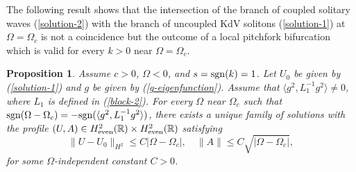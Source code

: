 \documentclass[12pt,reqno]{amsart}
\numberwithin{equation}{section}
\newtheorem{proposition}{Proposition}
\begin{document}
The following result shows that the intersection of the branch of coupled solitary waves (\ref{solution-2}) with the branch of uncoupled KdV solitons (\ref{solution-1}) at $\Omega = \Omega_c$ is not a coincidence but the outcome of a local pitchfork bifurcation which is valid for every $k > 0$ near $\Omega = \Omega_c$. 

\begin{proposition}
    \label{theorem-bifurcation-first}
    Assume $c > 0$, $\Omega < 0$, and $s = {\rm sgn}(k) = 1$.
    Let $U_0$ be given by (\ref{solution-1}) and $g$ be given by (\ref{g-eigenfunction}). 
    Assume that $\langle g^2, L_1^{-1} g^2 \rangle \neq 0$, where $L_1$ is defined in (\ref{block-2}). 
    For every $\Omega$ near $\Omega_c$ such that ${\rm sgn}(\Omega - \Omega_c) = -{\rm sgn}(\langle g^2, L_1^{-1} g^2 \rangle)$, 
    there exists a unique family of solutions with the profile $(U,A) \in H^2_{\rm even}(\mathbb{R}) \times H^2_{\rm even}(\mathbb{R})$ satisfying 
    $$
    \| U - U_0 \|_{H^2} \leq C |\Omega - \Omega_c|, \quad \| A \| \leq C \sqrt{|\Omega - \Omega_c|},
    $$
    for some $\Omega$-independent constant $C > 0$.
\end{proposition}
\end{document}
